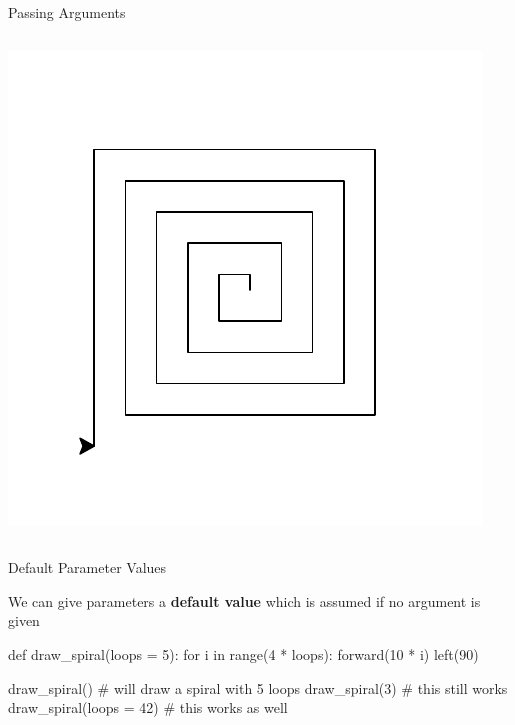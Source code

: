 \begin{frame}{Passing Arguments}
\begin{columns}[totalwidth = \textwidth]
\begin{column}{0.5\textwidth}
        \includegraphics[width = \textwidth]{03_Control_Structures/spiral4}

    \end{column}

    \end{columns}

\end{frame}

\begin{frame}[fragile]{Default Parameter Values}

    \begin{block}{}
        We can give parameters a \textbf{default value} which is assumed if no argument is given
    \end{block}

    \begin{pythoncode}
    def draw_spiral(loops = 5):
        for i in range(4 * loops):
            forward(10 * i)
            left(90)

    draw_spiral()   # will draw a spiral with 5 loops
    draw_spiral(3)  # this still works
    draw_spiral(loops = 42) # this works as well
    \end{pythoncode}

\end{frame}


